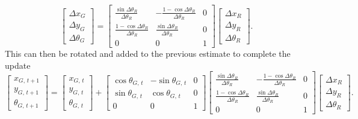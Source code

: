 \documentclass{article}
\begin{document}
$$
\begin{bmatrix}
    \Delta x_G \\
    \Delta y_G \\
    \Delta \theta_G
\end{bmatrix}
=
\begin{bmatrix}
    \frac{\operatorname{sin} \Delta \theta_R}{\Delta \theta_R} & -\frac{1 - \operatorname{cos} \Delta \theta_R}{\Delta \theta_R} & 0 \\[4pt]
    \frac{1 - \operatorname{cos} \Delta \theta_R}{\Delta \theta_R} & \frac{\operatorname{sin} \Delta \theta_R}{\Delta \theta_R} & 0 \\[4pt]
    0 & 0 & 1
\end{bmatrix}
\begin{bmatrix}
    \Delta x_R \\
    \Delta y_R \\
    \Delta \theta_R
\end{bmatrix}.
$$
This can then be rotated and added to the previous estimate to complete the update
$$
\begin{bmatrix}
    x_{G,\,t+1} \\
    y_{G,\,t+1} \\
    \theta_{G,\,t+1}
\end{bmatrix}
=
\begin{bmatrix}
    x_{G,\,t} \\
    y_{G,\,t} \\
    \theta_{G,\,t}
\end{bmatrix}
+
\begin{bmatrix}
    \operatorname{cos} \theta_{G,\,t} & -\operatorname{sin} \theta_{G,\,t} & 0 \\
    \operatorname{sin} \theta_{G,\,t} & \operatorname{cos} \theta_{G,\,t} & 0 \\
    0 & 0 & 1
\end{bmatrix}
\begin{bmatrix}
    \frac{\operatorname{sin} \Delta \theta_R}{\Delta \theta_R} & -\frac{1 - \operatorname{cos} \Delta \theta_R}{\Delta \theta_R} & 0 \\[4pt]
    \frac{1 - \operatorname{cos} \Delta \theta_R}{\Delta \theta_R} & \frac{\operatorname{sin} \Delta \theta_R}{\Delta \theta_R} & 0 \\[4pt]
    0 & 0 & 1
\end{bmatrix}
\begin{bmatrix}
    \Delta x_R \\
    \Delta y_R \\
    \Delta \theta_R
\end{bmatrix}.
$$
\end{document}
